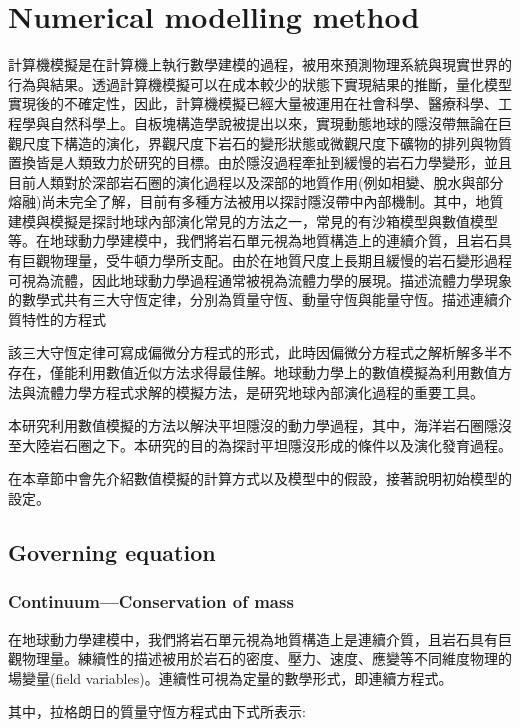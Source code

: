 
\chapter{Numerical modelling method}


計算機模擬是在計算機上執行數學建模的過程，被用來預測物理系統與現實世界的行為與結果。透過計算機模擬可以在成本較少的狀態下實現結果的推斷，量化模型實現後的不確定性，因此，計算機模擬已經大量被運用在社會科學、醫療科學、工程學與自然科學上。自板塊構造學說被提出以來，實現動態地球的隱沒帶無論在巨觀尺度下構造的演化，界觀尺度下岩石的變形狀態或微觀尺度下礦物的排列與物質置換皆是人類致力於研究的目標。由於隱沒過程牽扯到緩慢的岩石力學變形，並且目前人類對於深部岩石圈的演化過程以及深部的地質作用(例如相變、脫水與部分熔融)尚未完全了解，目前有多種方法被用以探討隱沒帶中內部機制。其中，地質建模與模擬是探討地球內部演化常見的方法之一，常見的有沙箱模型與數值模型等。在地球動力學建模中，我們將岩石單元視為地質構造上的連續介質，且岩石具有巨觀物理量，受牛頓力學所支配。由於在地質尺度上長期且緩慢的岩石變形過程可視為流體，因此地球動力學過程通常被視為流體力學的展現。描述流體力學現象的數學式共有三大守恆定律，分別為質量守恆、動量守恆與能量守恆。描述連續介質特性的方程式

該三大守恆定律可寫成偏微分方程式的形式，此時因偏微分方程式之解析解多半不存在，僅能利用數值近似方法求得最佳解。地球動力學上的數值模擬為利用數值方法與流體力學方程式求解的模擬方法，是研究地球內部演化過程的重要工具。

本研究利用數值模擬的方法以解決平坦隱沒的動力學過程，其中，海洋岩石圈隱沒至大陸岩石圈之下。本研究的目的為探討平坦隱沒形成的條件以及演化發育過程。

在本章節中會先介紹數值模擬的計算方式以及模型中的假設，接著說明初始模型的設定。

\section{Governing equation}

\subsection{Continuum---Conservation of mass}

在地球動力學建模中，我們將岩石單元視為地質構造上是連續介質，且岩石具有巨觀物理量。練續性的描述被用於岩石的密度、壓力、速度、應變等不同維度物理的場變量(field variables)。連續性可視為定量的數學形式，即連續方程式。

其中，拉格朗日的質量守恆方程式由下式所表示:


